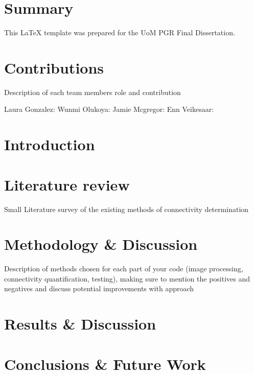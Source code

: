 \documentclass[12pt]{article}
\begin{document}
\section*{Summary}
     This LaTeX template was prepared for the UoM PGR Final Dissertation.
\newpage
\begin{singlespacing}
\tableofcontents
\end{singlespacing}
\setlength{\parskip}{1em}
\renewcommand{\baselinestretch}{2.0}

\newpage 
{}
\setcounter{page}{1}
\onehalfspacing

\section{Contributions}

Description of each team members role and contribution

Laura Gonzalez:
Wunmi Olukoya:
Jamie Mcgregor: 
Enn Veikesaar:




\section{Introduction}

\cite{SUNIL2020152457}
\cite{SHARMA2018546}
\cite{SIMON2021152817}


\section{Literature review}

Small Literature survey of the existing methods of connectivity determination


\section{Methodology \& Discussion}

Description of methods chosen for each part of your code (image processing, connectivity quantification, testing), making sure to mention the positives and negatives and discuss potential improvements with approach

\section{Results \& Discussion}


\section{Conclusions \& Future Work}




\newpage
\singlespacing


\end{document}
